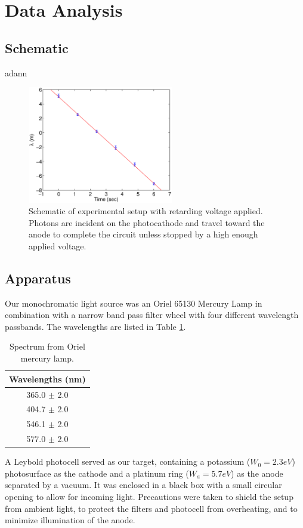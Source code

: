 \documentclass[aps,twocolumn,secnumarabic,nobalancelastpage,amsmath,amssymb,
nofootinbib]{revtex4}
\begin{document}
\section{Data Analysis}

\subsection{Schematic}

adann

\begin{figure}[htbp]
\includegraphics[width=2.5in]{schematic}
\caption{Schematic of experimental setup with retarding voltage applied.  Photons are incident on the photocathode and travel toward the anode to complete the circuit unless stopped by a high enough applied voltage.}
\label{fig:schematic}
\end{figure}

\subsection{Apparatus}

Our monochromatic light source was an Oriel 65130 Mercury Lamp in combination with a narrow band pass filter wheel with four different wavelength passbands.  The wavelengths are listed in Table \ref{tab:wavelengths}.

\begin{center}
\begin{table}[htbp]
\begin{tabular}{|c|}
\hline
Wavelengths (nm)\\
\hline
365.0 $\pm$ 2.0 \\
404.7 $\pm$ 2.0 \\
546.1 $\pm$ 2.0 \\
577.0 $\pm$ 2.0\\
\hline
\end{tabular}
\caption{\label{tab:wavelengths}Spectrum from Oriel mercury lamp.}
\end{table}
\end{center}
A Leybold photocell served as our target, containing a potassium ($W_0 = 2.3 eV$) photosurface as the cathode and a platinum ring ($W_a = 5.7 eV$) as the anode separated by a vacuum.  It was enclosed in a black box with a small circular opening to allow for incoming light.  Precautions were taken to shield the setup from ambient light, to protect the filters and photocell from overheating, and to minimize illumination of the anode.
\end{document}
